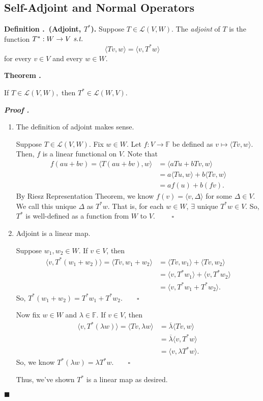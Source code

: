 \documentclass[11pt, letterpaper]{article}
\newcounter{index}[subsection]
\newenvironment*{df}[1]{\par\noindent\textbf{Definition \thesubsection.\stepcounter{index}\theindex\ (#1).}}{\par}
\newenvironment*{thm}[1]{\begin{tcolorbox}\par\noindent\textbf{Theorem \thesubsection.\stepcounter{index}\theindex\ #1} \par}{\par\end{tcolorbox}}
\newcounter{nprf}[subsection]
\newenvironment*{prf}{\par\indent\textbf{\textit{Proof \stepcounter{nprf}\thenprf.}}}{\hfill$\blacksquare$\par}
\def\F{\mathbb{F}}
\def\L{\mathcal{L}}
\def\st{\emph{ s.t. }}
\def\pqde{\qquad\square}
\begin{document}
\subsection{Self-Adjoint and Normal Operators}
\begin{df}{Adjoint, $T^*$}
	Suppose $T\in\L(V,W)$. The \textit{adjoint} of $T$ is the function $T^*:W\to V\st$ \[\langle Tv,w\rangle=\langle v,T^*w\rangle\] for every $v\in V$ and every $w\in W$.
\end{df}
\begin{thm}{}
	If $T\in\L(V,W),$ then $T^*\in\L(W,V).$
\end{thm}
\begin{prf}
	\begin{enumerate}
		\item The definition of adjoint makes sense.\par Suppose $T\in\L(V,W)$. Fix $w\in W$. Let $f:V\to\F$ be defined as $v\mapsto\langle Tv,w\rangle$. Then, $f$ is a linear functional on $V$. Note that \[\begin{aligned}f(au+bv)=\langle T(au+bv),w\rangle&=\langle aTu+bTv,w\rangle\\&=a\langle Tu,w\rangle+b\langle Tv,w\rangle\\&=af(u)+b(fv).\end{aligned}\] By Riesz Representation Theorem, we know $f(v)=\langle v,\Delta\rangle$ for some $\Delta\in V$. We call this unique $\Delta$ as $T^*w$. That is, for each $w\in W$, $\exists$ unique $T^*w\in V$. So, $T^*$ is well-defined as a function from $W$ to $V$. $\pqde$
		\item Adjoint is a linear map.\par Suppose $w_1,w_2\in W$. If $v\in V$, then \[\begin{aligned}\langle v,T^*(w_1+w_2)\rangle=\langle Tv,w_1+w_2\rangle&=\langle Tv,w_1\rangle+\langle Tv,w_2\rangle\\&=\langle v,T^*w_1\rangle+\langle v,T^*w_2\rangle\\&=\langle v,T^*w_1+T^*w_2\rangle.\end{aligned}\] So, $T^*(w_1+w_2)=T^*w_1+T^*w_2.\pqde$\par Now fix $w\in W$ and $\lambda\in\F$. If $v\in V$, then \[\begin{aligned}\langle v,T^*(\lambda w)\rangle=\langle Tv,\lambda w\rangle&=\overline{\lambda}\langle Tv,w\rangle\\&=\overline{\lambda}\langle v,T^*w\rangle\\&=\langle v,\lambda T^*w\rangle.\end{aligned}\] So, we know $T^*(\lambda w)=\lambda T^*w.\pqde$\par Thus, we've shown $T^*$ is a linear map as desired. 
	\end{enumerate}	
\end{prf}
\end{document}
